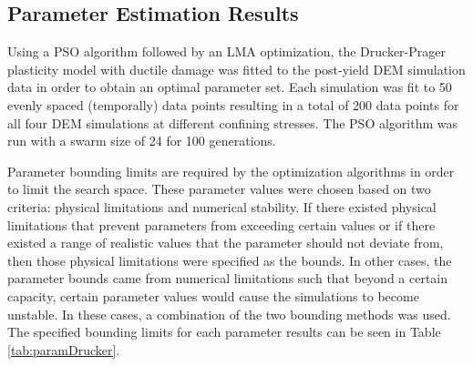 \subsection{Parameter Estimation Results}

Using a PSO algorithm followed by an LMA optimization, the Drucker-Prager plasticity model with ductile damage was fitted to the post-yield DEM simulation data in order to obtain an optimal parameter set. Each simulation was fit to 50 evenly spaced (temporally) data points resulting in a total of 200 data points for all four DEM simulations at different confining stresses. The PSO algorithm was run with a swarm size of 24 for 100 generations.

Parameter bounding limits are required by the optimization algorithms in order to limit the search space. These parameter values were chosen based on two criteria: physical limitations and numerical stability. If there existed physical limitations that prevent parameters from exceeding certain values or if there existed a range of realistic values that the parameter should not deviate from, then those physical limitations were specified as the bounds. In other cases, the parameter bounds came from numerical limitations such that beyond a certain capacity, certain parameter values would cause the simulations to become unstable. In these cases, a combination of the two bounding methods was used. The specified bounding limits for each parameter results can be seen in Table \ref{tab:paramDrucker}.

